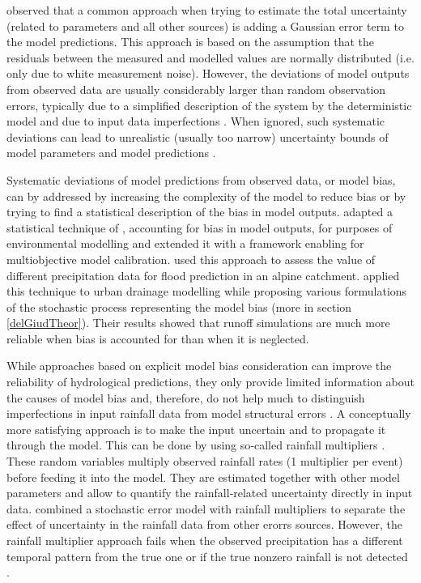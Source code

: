 \documentclass{ctuthesis}\usepackage[]{graphicx}\usepackage[]{color}
\begin{document}
\cite{dotto2012comparison} observed that a common approach when trying to estimate the total uncertainty (related to parameters and all other sources) is adding a Gaussian error term to the model predictions. This approach is based on the assumption that the residuals between the measured and modelled values are normally distributed (i.e. only due to white measurement noise). However, the deviations of model outputs from observed data are usually considerably larger than random observation errors, typically due to a simplified description of the system by the deterministic model and due to input data imperfections \citep{reichert2012linking}. When ignored, such systematic deviations can lead to unrealistic (usually too narrow) uncertainty bounds of model parameters and model predictions \citep{reichert2012linking}.

Systematic deviations of model predictions from observed data, or model bias, can by addressed by increasing the complexity of the model to reduce bias or by trying to find a statistical description of the bias in model outputs. \cite{reichert2012linking} adapted a statistical technique of \cite{kennedy2001bayesian}, accounting for bias in model outputs, for purposes of environmental modelling and extended it with a framework enabling for multiobjective model calibration. \cite{sikorskaValueDifferentPrecipitation2018} used this approach to assess the value of different precipitation data for flood prediction in an alpine catchment. \cite{giudice2013improving} applied this technique to urban drainage modelling while proposing various formulations of the stochastic process representing the model bias (more in section \ref{delGiudTheor}). Their results showed that runoff simulations are much more reliable when bias is accounted for than when it is neglected. 

While approaches based on explicit model bias consideration can improve the reliability of hydrological predictions, they only provide limited information about the causes of model bias and, therefore, do not help much to distinguish imperfections in input rainfall data from model structural errors \citep{giudice2013improving}. A conceptually more satisfying approach is to make the input uncertain and to propagate it through the model. This can be done by using so‐called rainfall multipliers \citep{kavetskiBayesianAnalysisInput2006, vrugtTreatmentInputUncertainty2008}. These random variables multiply observed rainfall rates (1 multiplier per event) before feeding it into the model. They are estimated together with other model parameters and allow to quantify the rainfall‐related uncertainty directly in input data. \cite{sikorskaBayesianUncertaintyAssessment2012} combined a stochastic error model with rainfall multipliers to separate the effect of uncertainty in the rainfall data from other erorrs sources. However, the rainfall multiplier approach fails when the observed precipitation has a different temporal pattern from the true one or if the true nonzero rainfall is not detected \citep{delgiudiceDescribingCatchmentaveragedPrecipitation2016}. 
\end{document}
